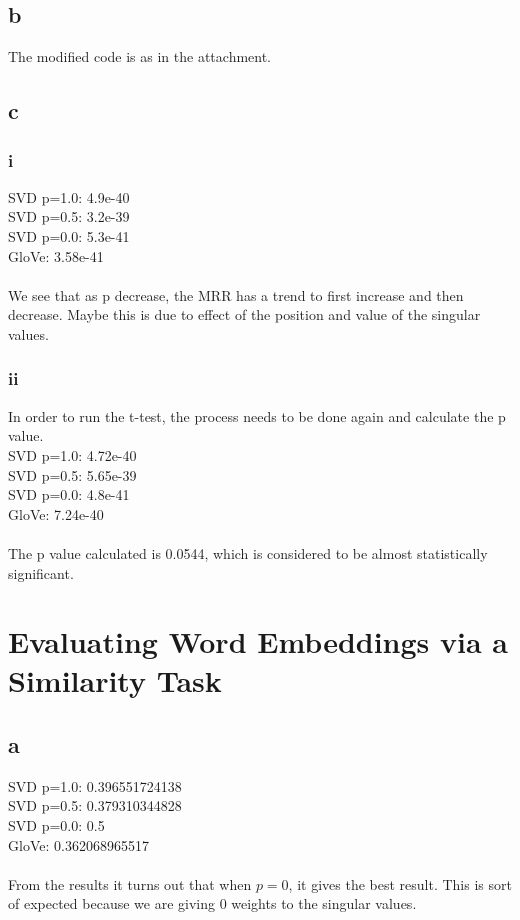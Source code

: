 \subsection{b}
The modified code is as in the attachment.

\subsection{c}
\subsubsection{i}
SVD p=1.0:  4.9e-40\\ 
SVD p=0.5:  3.2e-39 \\
SVD p=0.0:  5.3e-41\\ 
GloVe:     3.58e-41\\
\\
We see that as p decrease, the MRR has a trend to first increase and then decrease. Maybe this is due to effect of the position and value of the singular values. 
\subsubsection{ii}
In order to run the t-test, the process needs to be done again and calculate the p value. \\
SVD p=1.0:  4.72e-40\\ 
SVD p=0.5:   5.65e-39\\
SVD p=0.0:  4.8e-41 \\ 
GloVe:     7.24e-40\\
\\
The p value calculated is 0.0544, which is considered to be almost statistically significant.

\section{Evaluating Word Embeddings via a Similarity Task}
\subsection{a}
SVD p=1.0: 0.396551724138 \\ 
SVD p=0.5: 0.379310344828 \\
SVD p=0.0: 0.5	\\ 
GloVe:     0.362068965517 \\
\\
From the results it turns out that when $p=0$, it gives the best result. This is sort of expected because we are giving 0 weights to the singular values.

